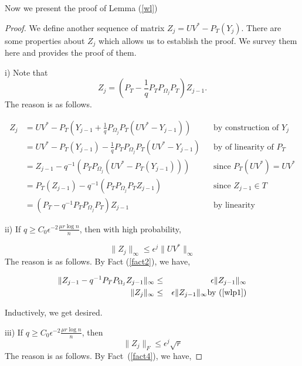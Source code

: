 Now we present the proof of Lemma (\ref{wl})

\begin{proof}
We define another sequence of matrix $Z_{j}=UV^{*}-P_{T}(Y_{j})$. There are some properties about $Z_{j}$ which allows us to establish the proof. We survey them here and provides the proof of them.

i) Note that 
\begin{equation}
Z_{j} = \left( P_{T}-\frac{1}{q}P_{T}P_{\Omega_{j}}P_{T} \right) Z_{j-1}. \label{wlp1}
\end{equation}
The reason is as follows.

\[
\begin{aligned}
Z_{j}
 & = UV^{*} - P_{T} \left( Y_{j-1} + \frac{1}{q}P_{\Omega_{j}} P_{T}(UV^{*}-Y_{j-1}) \right) 
 &&\text{by construction of } Y_j \\
 & = UV^{*} - P_{T} ( Y_{j-1}) - \frac{1}{q}P_{T} P_{\Omega_{j}} P_{T}( UV^{*} - Y_{j-1} ) 
 &&\text{by of linearity of } P_{T}\\
 & = Z_{j-1} - q^{-1}(P_{T}P_{\Omega_{j}}(UV^{*}-P_{T}(Y_{j-1}))) 
 &&\text{since } P_{T}(UV^{*}) = UV^{*}\\
 & = P_{T}(Z_{j-1}) - q^{-1}(P_{T}P_{\Omega_{j}}P_{T}Z_{j-1}) 
 &&\text{since } Z_{j-1}\in T\\
 & = ( P_{T} - q^{-1} P_{T} P_{\Omega_{j}} P_{T} ) Z_{j-1} 
 &&\text{by linearity}
\end{aligned}
\]

ii) If $q\ge C_{0}\epsilon^{-2}\frac{\mu r\log n}{n}$, then  with high probability, 

\begin{equation} 
\| Z_{j}\|_{\infty}\le\epsilon^{j}\|UV^{*}\|_{\infty} \label{wlp2}
\end{equation}
The reason is as follows. By Fact (\ref{fact2}), we have,

\begin{eqnarray*}
\|Z_{j-1}-q^{-1}P_{T}P_{\Omega_{j}}Z_{j-1}\|_{\infty} & \le & \epsilon\|Z_{j-1}\|_{\infty} \\
\|Z_{j}\|_{\infty} & \le & \epsilon\|Z_{j-1}\|_{\infty} \text{by (\ref{wlp1})}
\end{eqnarray*}


Inductively, we get desired.

iii) If $q\ge C_{0}\epsilon^{-2}\frac{\mu r\log n}{n}$, then 
\begin{equation} 
\|Z_{j}\|_{F}\le\epsilon^{j}\sqrt{r}  \label{wlp3}
\end{equation} 
The reason is as follows. By Fact~(\ref{fact4}), we have,


\end{proof}
